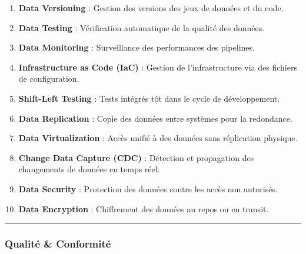 \documentclass[
  letterpaper,
  DIV=11,
  numbers=noendperiod]{scrartcl}
\providecommand{\tightlist}{%
  \setlength{\itemsep}{0pt}\setlength{\parskip}{0pt}}\usepackage{longtable,booktabs,array}
\begin{document}
\begin{enumerate}
\def\labelenumi{\arabic{enumi}.}
\setcounter{enumi}{20}
\tightlist
\item
  \textbf{Data Versioning} : Gestion des versions des jeux de données et
  du code.\\
\item
  \textbf{Data Testing} : Vérification automatique de la qualité des
  données.\\
\item
  \textbf{Data Monitoring} : Surveillance des performances des
  pipelines.\\
\item
  \textbf{Infrastructure as Code (IaC)} : Gestion de l'infrastructure
  via des fichiers de configuration.\\
\item
  \textbf{Shift-Left Testing} : Tests intégrés tôt dans le cycle de
  développement.\\
\item
  \textbf{Data Replication} : Copie des données entre systèmes pour la
  redondance.\\
\item
  \textbf{Data Virtualization} : Accès unifié à des données sans
  réplication physique.\\
\item
  \textbf{Change Data Capture (CDC)} : Détection et propagation des
  changements de données en temps réel.\\
\item
  \textbf{Data Security} : Protection des données contre les accès non
  autorisés.\\
\item
  \textbf{Data Encryption} : Chiffrement des données au repos ou en
  transit.
\end{enumerate}

\begin{center}\rule{0.5\linewidth}{0.5pt}\end{center}

\subsubsection{\texorpdfstring{\textbf{Qualité \&
Conformité}}{Qualité \& Conformité}}\label{qualituxe9-conformituxe9}
\end{document}
